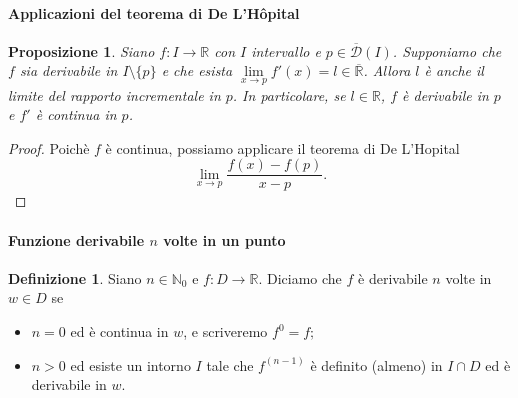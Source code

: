 \documentclass{article}
\theoremstyle{plain}
\newtheorem{prop}[thm]{Proposizione}
\theoremstyle{definition}
\newtheorem{defn}{Definizione}[section]
\theoremstyle{remark}
\begin{document}
\vspace{10pt}

\paragraph{Applicazioni del teorema di De L'Hôpital}
\begin{bxthm}
\begin{prop}
    Siano $f:I\to\mathbb{R}$ con $I$ intervallo e $p\in\overline{\mathcal{D}}(I)$. Supponiamo che $f$ sia derivabile in $I\setminus\{p\}$ e che esista $\lim\limits_{x\to p}f'(x)=l\in\overline{\mathbb{R}}$.
    Allora $l$ è anche il limite del rapporto incrementale in $p$. In particolare, se $l\in\mathbb{R}$, $f$ è derivabile in $p$ e $f'$ è continua in $p$.
\end{prop}
\end{bxthm}
\begin{proof}
    Poichè $f$ è continua, possiamo applicare il teorema di De L'Hopital \[\lim_{x\to p}\dfrac{f(x)-f(p)}{x-p}.\]
\end{proof}

\vspace{10pt}

\paragraph{Funzione derivabile $n$ volte in un punto}
\begin{bxthm}
\begin{defn}
    Siano $n\in\mathbb{N}_0$ e $f:D\to\mathbb{R}$. Diciamo che $f$ è derivabile $n$ volte in $w\in D$ se 
    \begin{itemize}
        \item $n=0$ ed è continua in $w$, e scriveremo \(f^{0}=f;\)
        \item $n>0$ ed esiste un intorno $I$ tale che $f^{(n-1)}$ è definito (almeno) in $I\cap D$ ed è derivabile in $w$.
    \end{itemize}
\end{defn}
\end{bxthm}

\vspace{10pt}
\end{document}
